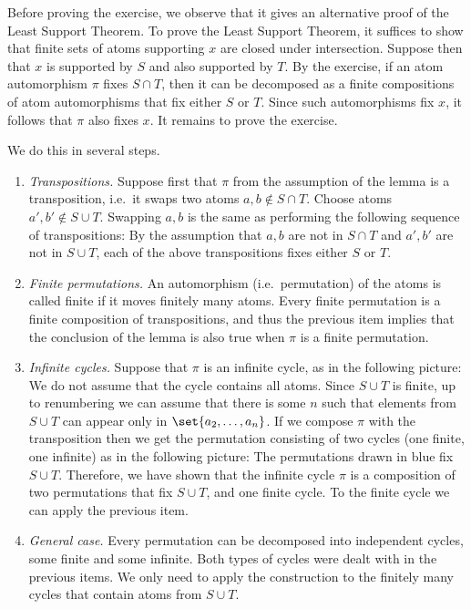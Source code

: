  {Before proving the exercise, we observe that it gives an alternative proof of the Least Support Theorem. To prove the Least Support Theorem, it suffices to show that finite sets of atoms supporting $x$ are closed under intersection. Suppose then that $x$ is supported by $S$ and also supported by $T$. By the exercise, if an atom automorphism $\pi$ fixes $S \cap T$, then it can be decomposed as a finite compositions of atom automorphisms that fix either $S$ or $T$. Since such automorphisms fix $x$, it follows that $\pi$ also fixes $x$. It remains to prove the exercise. 
 
 We do this in several steps.
 \begin{enumerate}
 \item \emph{Transpositions.} Suppose first that $\pi$ from the assumption of the lemma is a transposition, i.e.~it swaps two atoms $a,b \not \in S \cap T$. Choose atoms $a',b' \not \in S \cup T$. Swapping $a,b$ is the same as performing the following sequence of transpositions:
 By the assumption that $a,b$ are not in $S \cap T$ and $a',b'$ are not in $S \cup T$, each of the above transpositions fixes either $S$ or $T$.
 \item \emph{Finite permutations.} An automorphism (i.e.~permutation) of the atoms is called finite if it moves finitely many atoms. Every finite permutation is a finite composition of transpositions, and thus the previous item implies that the conclusion of the lemma is also true when $\pi$ is a finite permutation.
 \item \emph{Infinite cycles.} Suppose that $\pi$ is an infinite cycle, as in the following picture: 
 We do not assume that the cycle contains all atoms. 
 Since $S \cup T$ is finite, up to renumbering we can assume that there is some $n$ such that elements from $S \cup T$ can appear only in $\set{a_2,\ldots,a_n}$.
 If we compose $\pi$ with the transposition  then we get the permutation consisting of two cycles (one finite, one infinite) as in the following picture: 
 The permutations drawn in blue fix $S \cup T$. Therefore, we have shown that the infinite cycle $\pi$ is a composition of two permutations that fix $S \cup T$, and one finite cycle. To the finite cycle we can apply the previous item.
 \item \emph{General case.} Every permutation can be decomposed into independent cycles, some finite and some infinite. Both types of cycles were dealt with in the previous items. We only need to apply the construction to the finitely many cycles that contain atoms from $S \cup T$.
 \end{enumerate}
 }

